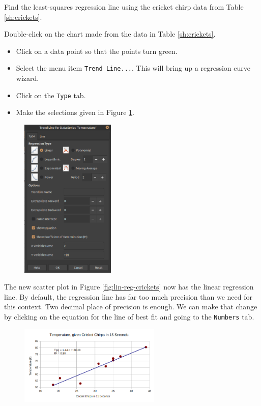 \begin{example}
Find the least-squares regression line using the cricket chirp data from Table \ref{sh:crickets}.

\begin{solution} Double-click on the chart made from the data in Table \ref{sh:crickets}.
  \begin{itemize}
    \item Click on a data point so that the points turn green.
    \item Select the menu item {\tt Trend Line...}. This will bring up a regression curve wizard.
    \item Click on the {\tt Type} tab.
    \item Make the selections given in Figure \ref{fig:lin-reg-menu}.
  \end{itemize}
  \begin{figure}[!ht]
        \centering
        \includegraphics[width=0.4\textwidth]{img/chap1/sec1-4/lin-reg-crickets-menu.png}
        \caption{}
        \label{fig:lin-reg-menu}
  \end{figure}
  The new scatter plot in Figure \ref{fig:lin-reg-crickets} now has the linear regression line. By default, the regression line has far too much precision than we need for this context. Two decimal place of precision is enough. We can make that change by clicking on the equation for the line of best fit and going to the {\tt Numbers} tab.
  \begin{figure}[!ht]
    \centering
      \includegraphics[width=0.6\textwidth]{img/chap1/sec1-4/lin-reg-crickets.png}

\end{figure}
\end{solution}
\end{example}
